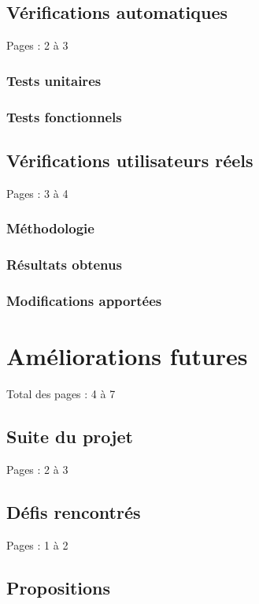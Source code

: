 \documentclass{eplmastersthesis_FR}
\begin{document}
		\section{Vérifications automatiques}

			Pages : 2 à 3

			\subsection*{Tests unitaires}
			\subsection*{Tests fonctionnels}

		\section{Vérifications utilisateurs réels}

			Pages : 3 à 4

			\subsection*{Méthodologie}
			\subsection*{Résultats obtenus}
			\subsection*{Modifications apportées}

	\chapter{Améliorations futures}

		Total des pages : 4 à 7

		\section{Suite du projet}

			Pages : 2 à 3

		\section{Défis rencontrés}

			Pages : 1 à 2

		\section{Propositions}
\end{document}
